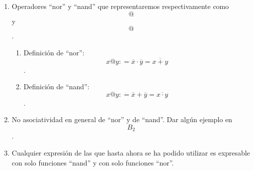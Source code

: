 \begin{enumerate}
\begin{enumerate}
\begin{enumerate}
\begin{enumerate}
\begin{enumerate}
          \emph{\textbf{a.5.HI.tts+tts*)}} La expresión sería una del
          tipo
          \[{T_{1} \cdot \mathit{TS}_{2}} = {T_{2} \cdot \mathit{TS}_{3}}\]
          ,
          \[{\left( {T_{1}{' + \mathit{TS}_{0}}} \right) + \mathit{TS}_{2}} = {\left( {T_{2}{' + \mathit{TS}_{1}}} \right) \cdot \mathit{TS}_{3}}\],
          dónde para \[T'\] suponemos (HI), que los valores de verdad de
          \[T_{1}{{' + \mathit{TS}_{2}} = T_{2}}{' + \mathit{TS}_{3}}\]
          son idénticos a los de
          \[\widetilde{T_{1}}{{' \cdot \widetilde{\mathit{TS}_{2}}} = \widetilde{T_{2}}}{' \cdot \widetilde{\mathit{TS}_{3}}}\]
          y viceversa. Ahora bien \[\mathit{TS}_{0} + \mathit{TS}_{2}\]
          podemos redu\-cirlo finalmente a un literal por evaluación,
          concretamente a una variable \[X\] o a una constante
          \[\Gamma\], e idénticamente para
          \[\mathit{TS}_{1} \cdot \mathit{TS}_{3}\].
          \[T_{2}{' \cdot \mathit{TS}_{3}}\]es lo mismo que una
          \[T_{3}\] cualquiera (de cualquier longitud). Así nos queda
          \[T_{1}{{' + L_{1}} = {T_{3} \cdot L_{2}}}\]que ya ha sido
          demostrado en \emph{a.5.tts+tts+)}. Así queda demostrado este
          caso.

          a.5.HI.t.neg) Cualquier T.p negado es susceptible de ser
          desarrollado (por las leyes de De Morgan) como un T.p y se
          aplica \emph{a.5.HI.*}.
        \item
          Casos en que la expresión \[E\]
          es\[T_{1} \neq T_{2}\]afirmativa:

          Estos casos se reduden a que alguna variable siempre es vacía
          tanto en la ex\-presión original como en la dual. Se reducen a
          los casos anteriores.
        \end{enumerate}
      \end{enumerate}
    \item
      Operadores ``nor'' y ``nand'' que representaremos respectivamente
      como \[@\]y \[@\].

      \begin{enumerate}
      \def\labelenumiv{\arabic{enumiv}.}
      \tightlist
      \item
        Definición de ``nor'':
        \[{x@y}{: =}{{\overline{x} \cdot \overline{y}} = \overline{x+y}}\].
      \item
        Definición de ``nand'':
        \[{x@y}{: =}{{\overline{x} + \overline{y}} = \overline{x\cdot y}}\].
      \end{enumerate}
    \item
      No asociatividad en general de ``nor'' y de ``nand''. Dar algún
      ejemplo en \[B_{2}\].
    \item
      Cualquier expresión de las que hasta ahora se ha podido utilizar
      es expresable con solo funciones ``nand'' y con solo funciones
      ``nor''.


\end{enumerate}
\end{enumerate}
\end{enumerate}
